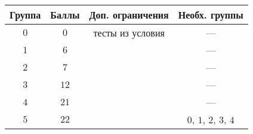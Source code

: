 \begin{center}
\renewcommand{\arraystretch}{1.5}
\begin{tabular}{|c|c|c|c|}
\hline
\textbf{Группа} & \textbf{Баллы} & \textbf{Доп. ограничения} & \textbf{Необх. группы} \\ \hline
$0$ & $0$ & тесты из условия & --- \\ \hline
$1$ & $6$ &  & --- \\ \hline
$2$ & $7$ &  & --- \\ \hline
$3$ & $12$ &  & --- \\ \hline
$4$ & $21$ &  & --- \\ \hline
$5$ & $22$ &  & $0$, $1$, $2$, $3$, $4$ \\ \hline
\end{tabular}
\end{center}

